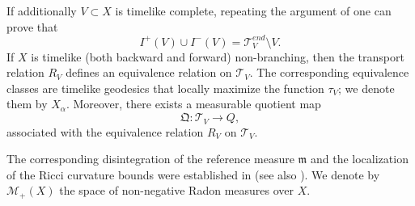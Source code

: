 \documentclass[a4paper,10pt]{article}
\newcommand{\T}{\mathcal{T}}
\newcommand{\mm}{\mathfrak m}
\newcommand{\QQ}{\mathfrak Q}
\theoremstyle{plain}
\theoremstyle{definition}
\numberwithin{equation}{section}
\begin{document}
\noindent
If  additionally $V\subset X$ is timelike complete, 
repeating the argument of \cite[Lemma 4.4]{CaMo:20} one can prove that 
%
$$ 
I^{+}(V) \cup I^{-}(V)  = \mathcal{T}_{V}^{end}    \setminus V.
$$
%
If $X$ is timelike (both backward and forward) non-branching, then the transport relation $R_{V}$ defines an equivalence relation on $\T_{V}$. 
The corresponding equivalence classes are timelike geodesics that locally maximize the function $\tau_{V}$; we denote them by $X_{\alpha}$.
%
Moreover, there exists a measurable quotient map 
\[
\QQ : \T_{V} \to Q,
\]
associated with the equivalence relation $R_{V}$ on $\T_{V}$.

The corresponding disintegration of the reference measure $\mm$ and the localization of the Ricci curvature bounds were established in \cite{CaMo:20} (see also \cite{cavalletti2024sharpisoperimetrictypeinequalitylorentzian, BraunMcCann}). We denote by $\mathcal{M}_{+}(X)$ the space of non-negative Radon measures over $X$.
\end{document}
